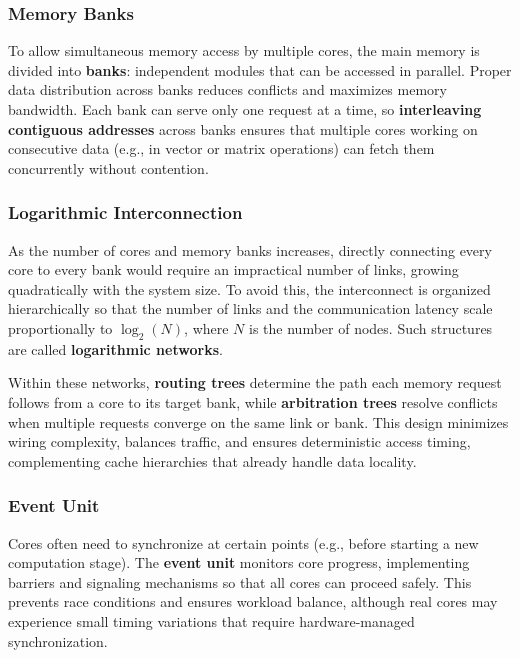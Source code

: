 
\subsubsection{Memory Banks}
To allow simultaneous memory access by multiple cores, the main memory is divided into \textbf{banks}: independent modules that can be accessed in parallel. Proper data distribution across banks reduces conflicts and maximizes memory bandwidth. Each bank can serve only one request at a time, so \textbf{interleaving contiguous addresses} across banks ensures that multiple cores working on consecutive data (e.g., in vector or matrix operations) can fetch them concurrently without contention.  

\subsubsection{Logarithmic Interconnection}
As the number of cores and memory banks increases, directly connecting every core to every bank would require an impractical number of links, growing quadratically with the system size. To avoid this, the interconnect is organized hierarchically so that the number of links and the communication latency scale proportionally to $\log_2(N)$, where $N$ is the number of nodes. Such structures are called \textbf{logarithmic networks}.  

Within these networks, \textbf{routing trees} determine the path each memory request follows from a core to its target bank, while \textbf{arbitration trees} resolve conflicts when multiple requests converge on the same link or bank. This design minimizes wiring complexity, balances traffic, and ensures deterministic access timing, complementing cache hierarchies that already handle data locality.


\subsubsection{Event Unit}
Cores often need to synchronize at certain points (e.g., before starting a new computation stage). The \textbf{event unit} monitors core progress, implementing barriers and signaling mechanisms so that all cores can proceed safely. This prevents race conditions and ensures workload balance, although real cores may experience small timing variations that require hardware-managed synchronization.  


